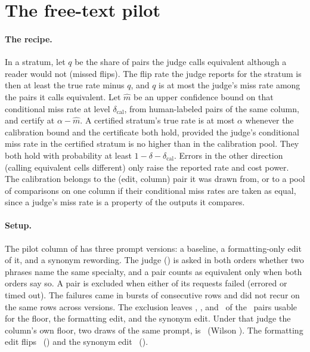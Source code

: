\begin{table}[t]
\caption{Simulated probability that the certifier errs on a stratum one
flip past its budget, by the dispersion ratio of flip counts within
blocks of \indepBlockSize\ draws (deployment stratum; nominal
per-stratum level \calNominalDelta).}
\label{tab:dependence}
\centering\small

\end{table}
\par
\fi

\ifnum{}\relax
\FloatBarrier
\keepheading
\section{The free-text pilot}
\label{app:pilot}
\keeprunin
\paragraph{The recipe.} In a stratum, let $q$ be the share of pairs the
judge calls equivalent although a reader would not (missed flips). The
flip rate the judge reports for the stratum is then at least the true
rate minus $q$, and $q$ is at most the judge's miss rate among the pairs
it calls equivalent. Let $\hat{m}$ be an upper confidence bound on that
conditional miss rate at level $\delta_{\mathrm{cal}}$, from
human-labeled pairs of the same column, and certify at
$\alpha - \hat{m}$. A certified stratum's true rate is at most $\alpha$
whenever the calibration bound and the certificate both hold, provided
the judge's conditional miss rate in the certified stratum is no higher
than in the calibration pool. They both hold with probability at least
$1 - \delta - \delta_{\mathrm{cal}}$. Errors in the other direction
(calling equivalent cells different) only raise the reported rate and
cost power. The calibration belongs to the (edit, column) pair it was
drawn from, or to a pool of comparisons on one column if their
conditional miss rates are taken as equal, since a judge's miss rate is
a property of the outputs it compares.

\keeprunin
\paragraph{Setup.} The pilot column of  has three
prompt versions: a baseline, a formatting-only edit of it, and a synonym
rewording. The judge (\pilotJudgeModel) is asked in both orders
whether two phrases name the same specialty, and a pair counts as
equivalent only when both orders say so. A pair is excluded when either
of its requests failed (errored or timed out). The failures came in bursts
of consecutive rows and did not recur on the same rows across versions.
The exclusion leaves \pilotFloorUsable, \pilotFmtUsable, and
\pilotSynUsable\ of the \pilotRows\ pairs usable for the floor, the
formatting edit, and the synonym edit. Under that judge the column's own
floor, two draws of the same prompt, is \pilotFloorRate\ (Wilson
\pilotFloorCi). The formatting edit flips \pilotFmtRate\ (\pilotFmtCi)
and the synonym edit \pilotSynRate\ (\pilotSynCi).

